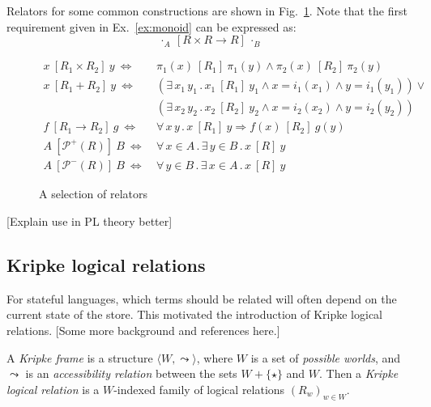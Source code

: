 \documentclass[sigplan,10pt,review,anonymous]{acmart}
\newcommand{\ifr}[1]{\ [{#1}]\ }
\begin{document}
Relators for some common constructions are shown in Fig.~\ref{fig:relators}.
Note that the first requirement given in Ex.~\ref{ex:monoid}
can be expressed as:
\[
  \cdot_A \ifr{R \times R \rightarrow R} \cdot_B
\]

\begin{figure}
  \begin{align*}
    x \ifr{R_1 \times R_2} y \ \Leftrightarrow\  &
      \pi_1(x) \ifr{R_1} \pi_1(y) \wedge
      \pi_2(x) \ifr{R_2} \pi_2(y) \\
    x \ifr{R_1 + R_2} y \ \Leftrightarrow\  &
      (\exists \, x_1 \, y_1 \,.\,
        x_1 \ifr{R_1} y_1 \wedge
        x = i_1(x_1) \wedge
        y = i_1(y_1)) \vee \\ &
      (\exists \, x_2 \, y_2 \,.\,
        x_2 \ifr{R_2} y_2 \wedge
        x = i_2(x_2) \wedge
        y = i_2(y_2)) \\
    f \ifr{R_1 \rightarrow R_2} g \ \Leftrightarrow\  &
      \forall \, x \, y \,.\,
        x \ifr{R_1} y \Rightarrow
        f(x) \ifr{R_2} g(y) \\
    A \ifr{\mathcal{P}^+(R)} B \ \Leftrightarrow\  &
      \forall \, x \in A \,.\,
      \exists \, y \in B \,.\,
      x \ifr{R} y \\
    A \ifr{\mathcal{P}^-(R)} B \ \Leftrightarrow\  &
      \forall \, y \in B \,.\,
      \exists \, x \in A \,.\,
      x \ifr{R} y
  \end{align*}
  \caption{A selection of relators}
  \label{fig:relators}
\end{figure}

[Explain use in PL theory better]


\subsection{Kripke logical relations} %

For stateful languages,
which terms should be related
will often depend on the current state of the store.
This motivated the introduction of Kripke logical relations.
[Some more background and references here.]

\begin{definition}
A \emph{Kripke frame} is a structure $\langle W, \leadsto \rangle$, where
$W$ is a set of \emph{possible worlds}, and
$\leadsto$ is an \emph{accessibility relation}
between the sets $W + \{\star\}$ and $W$.
Then a \emph{Kripke logical relation} is
a $W$-indexed family of logical relations $(R_w)_{w \in W}$.
\end{definition}
\end{document}

